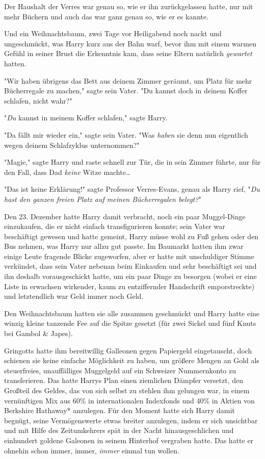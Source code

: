 {Der Haushalt der Verres war genau so, wie er ihn zurückgelassen hatte, nur mit mehr Büchern und auch das war ganz genau so, wie er es kannte.

Und ein Weihnachtsbaum, zwei Tage vor Heiligabend noch nackt und ungeschmückt, was Harry kurz aus der Bahn warf, bevor ihm mit einem warmen Gefühl in seiner Brust die Erkenntnis kam, dass seine Eltern natürlich \emph{gewartet} hatten.

"Wir haben übrigens das Bett aus deinem Zimmer geräumt, um Platz für mehr Bücherregale zu machen," sagte sein Vater. "Du kannst doch in deinem Koffer schlafen, nicht wahr?"

"\emph{Du} kannst in meinem Koffer schlafen," sagte Harry.

"Da fällt mir wieder ein," sagte sein Vater. "Was \emph{haben} sie denn nun eigentlich wegen deinem Schlafzyklus unternommen?"

"Magie," sagte Harry und raste schnell zur Tür, die in sein Zimmer führte, nur für den Fall, dass Dad \emph{keine} Witze machte…

"Das ist keine Erklärung!" sagte Professor Verres-Evans, genau als Harry rief, "\emph{Du hast den ganzen freien Platz auf meinen Bücherregalen belegt?}"

\later

Den 23. Dezember hatte Harry damit verbracht, noch ein paar Muggel-Dinge einzukaufen, die er nicht einfach transfigurieren konnte; sein Vater war beschäftigt gewesen und hatte gemeint, Harry müsse wohl zu Fuß gehen oder den Bus nehmen, was Harry nur allzu gut passte. Im Baumarkt hatten ihm zwar einige Leute fragende Blicke zugeworfen, aber er hatte mit unschuldiger Stimme verkündet, dass sein Vater nebenan beim Einkaufen und sehr beschäftigt sei und ihn deshalb vorausgeschickt hatte, um ein paar Dinge zu besorgen (wobei er eine Liste in erwachsen wirkender, kaum zu entziffernder Handschrift emporstreckte) und letztendlich war Geld immer noch Geld.

Den Weihnachtsbaum hatten sie alle zusammen geschmückt und Harry hatte eine winzig kleine tanzende Fee auf die Spitze gesetzt (für zwei Sickel und fünf Knuts bei Gambol \& Japes).

Gringotts hatte ihm bereitwillig Galleonen gegen Papiergeld eingetauscht, doch schienen sie keine einfache Möglichkeit zu haben, um größere Mengen an Gold als steuerfreies, unauffälliges Muggelgeld auf ein Schweizer Nummernkonto zu transferieren. Das hatte Harrys Plan einen ziemlichen Dämpfer versetzt, den Großteil des Geldes, das von sich selbst zu stehlen ihm gelungen war, in einem vernünftigen Mix aus 60\% in internationalen Indexfonds und 40\% in Aktien von Berkshire Hathaway* anzulegen. Für den Moment hatte sich Harry damit begnügt, seine Vermögenswerte etwas breiter anzulegen, indem er sich unsichtbar und mit Hilfe des Zeitumkehrers spät in der Nacht hinausgeschlichen und einhundert goldene Galeonen in seinem Hinterhof vergraben hatte. Das hatte er ohnehin schon immer, immer, \emph{immer} einmal tun wollen.

}
